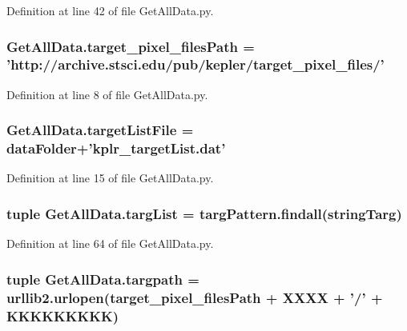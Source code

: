 Definition at line 42 of file Get\-All\-Data.\-py.

\hypertarget{namespace_get_all_data_a45b4d0dc9728eff931ef547819c19225}{
\subsubsection[{target\-\_\-pixel\-\_\-files\-Path}]{ Get\-All\-Data.\-target\-\_\-pixel\-\_\-files\-Path = 'http\-://archive.\-stsci.\-edu/pub/kepler/target\-\_\-pixel\-\_\-files/'}}\label{namespace_get_all_data_a45b4d0dc9728eff931ef547819c19225}


Definition at line 8 of file Get\-All\-Data.\-py.

\hypertarget{namespace_get_all_data_a651d69300ed082b3426d3910b6c6a5f7}{
\subsubsection[{target\-List\-File}]{ Get\-All\-Data.\-target\-List\-File = {\bf data\-Folder}+'kplr\-\_\-target\-List.\-dat'}}\label{namespace_get_all_data_a651d69300ed082b3426d3910b6c6a5f7}


Definition at line 15 of file Get\-All\-Data.\-py.

\hypertarget{namespace_get_all_data_a0e405ac3485c0d9036936f1e1639d262}{
\subsubsection[{targ\-List}]{\setlength{\rightskip}{0pt plus 5cm}tuple Get\-All\-Data.\-targ\-List = targ\-Pattern.\-findall({\bf string\-Targ})}}\label{namespace_get_all_data_a0e405ac3485c0d9036936f1e1639d262}


Definition at line 64 of file Get\-All\-Data.\-py.

\hypertarget{namespace_get_all_data_a2dafe0984549f093bb5d258640946102}{
\subsubsection[{targpath}]{\setlength{\rightskip}{0pt plus 5cm}tuple Get\-All\-Data.\-targpath = urllib2.\-urlopen({\bf target\-\_\-pixel\-\_\-files\-Path} + {\bf X\-X\-X\-X} + '/' + {\bf K\-K\-K\-K\-K\-K\-K\-K\-K})}}\label{namespace_get_all_data_a2dafe0984549f093bb5d258640946102}


